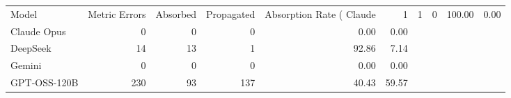 \begin{tabular}{lrrrrr}
\toprule
Model & Metric Errors & Absorbed & Propagated & Absorption Rate (%
\midrule
Claude & 1 & 1 & 0 & 100.00 & 0.00 \\
Claude Opus & 0 & 0 & 0 & 0.00 & 0.00 \\
DeepSeek & 14 & 13 & 1 & 92.86 & 7.14 \\
Gemini & 0 & 0 & 0 & 0.00 & 0.00 \\
GPT-OSS-120B & 230 & 93 & 137 & 40.43 & 59.57 \\
\bottomrule
\end{tabular}
